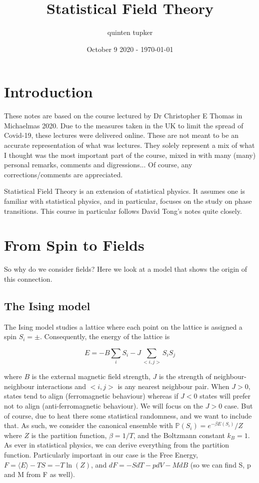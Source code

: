 \documentclass{article}
\title{Statistical Field Theory}
\author{quinten tupker}
\date{October 9 2020 - \today}
\theoremstyle{definition}
\begin{document}
\maketitle

\section*{Introduction}

These notes are based on the course lectured by Dr Christopher E Thomas in
Michaelmas 2020. Due to the measures taken in the UK to limit the spread of
Covid-19, these lectures were delivered online. These are not meant to be an
accurate representation of what was lectures. They solely represent a mix of
what I thought was the most important part of the course, mixed in with many
(many) personal remarks, comments and digressions... Of course, any
corrections/comments are appreciated.

Statistical Field Theory is an extension of statistical physics. It assumes one
is familiar with statistical physics, and in particular, focuses on the study on
phase transitions. This course in particular follows David Tong's notes quite
closely.

\section{From Spin to Fields}

So why do we consider fields? Here we look at a model that shows the origin of
this connection.

\subsection{The Ising model}

The Ising model studies a lattice where each point on the lattice is assigned a
spin $S_i = \pm$. Consequently, the energy of the lattice is

$$ E = -B \sum_i S_i - J \sum_{<i, j>} S_i S_j $$

where $B$ is the external magnetic field strength, $J$ is the strength of
neighbour-neighbour interactions and $<i, j>$ is any nearest neighbour pair.
When $J > 0$, states tend to align (ferromagnetic behaviour) whereas if $J < 0$
states will prefer not to align (anti-ferromagnetic behaviour). We will focus on
the $J > 0$ case. But of course, due to heat there some statistical randomness,
and we want to include that. As such, we consider the canonical ensemble with
$\mathbb{P} (S_i) = e^{-\beta E(S_i)} / Z$ where $Z$ is the partition function,
$\beta = 1 / T$, and the Boltzmann constant $k_B = 1$. As ever in statistical
physics, we can derive everything from the partition function. Particularly
important in our case is the Free Energy, $F = \langle E \rangle - TS = -T \ln
(Z)$, and $dF = -S dT - p dV - M dB$ (so we can find S, p and M from F as well).
\end{document}
